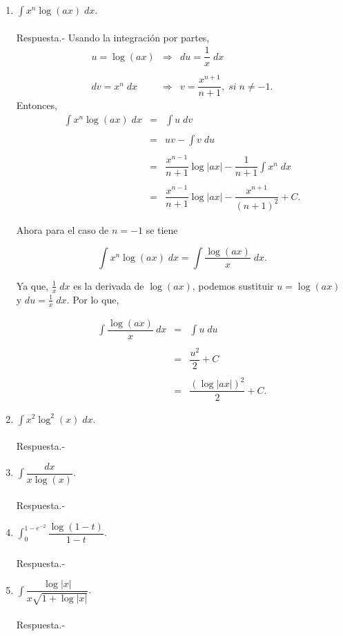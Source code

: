 \begin{enumerate}[\bfseries 1.]
    \item $\displaystyle\int x^n \log(ax)\; dx$.\\\\
	Respuesta.-\; Usando la integración por partes,
	$$
	\begin{array}{rcl}
	    u=\log(ax) &\Rightarrow& du=\dfrac{1}{x}\; dx\\\\
	    dv=x^n\; dx &\Rightarrow& v=\dfrac{x^{n+1}}{n+1}, \; si \; n\neq -1.
	\end{array}
	$$
	Entonces,
	$$
	\begin{array}{rcl}
	    \displaystyle\int x^n \log(ax)\; dx &=& \int u \; dv\\\\
						&=& uv-\displaystyle\int v\; du\\\\
						&=& \dfrac{x^{n-1}}{n+1}\log|ax| - \dfrac{1}{n+1}\displaystyle\int x^{n}\; dx\\\\
						&=& \dfrac{x^{n-1}}{n+1}\log|ax| - \dfrac{x^{n+1}}{(n+1)^2}+C.
	\end{array}
	$$

	Ahora para el caso de $n=-1$ se tiene

	$$\int x^n\log(ax)\; dx = \int \dfrac{\log(ax)}{x}\; dx.$$

	Ya que, $\frac{1}{x}\; dx$ es la derivada de $\log(ax)$, podemos sustituir $u=\log(ax)$ y $du=\frac{1}{x}\; dx$. Por lo que,

	$$
	\begin{array}{rcl}
	    \displaystyle\int \dfrac{\log(ax)}{x}\: dx &=& \displaystyle\int u\; du\\\\
						 &=& \dfrac{u^2}{2}+C\\\\
						 &=& \dfrac{(\log|ax|)^2}{2}+C.
	\end{array}
	$$
	\vspace{.5cm}


    \item $\displaystyle\int x^2\log^2(x)\; dx$.\\\\
	Respuesta.-\; 

    \item $\displaystyle\int \dfrac{dx}{x\log(x)}$.\\\\
	Respuesta.-\;

    \item $\displaystyle\int_0^{1-e^{-2}} \dfrac{\log(1-t)}{1-t}$.\\\\
	Respuesta.-\;

    \item $\displaystyle\int \dfrac{\log|x|}{x\sqrt{1+\log|x|}}$.\\\\
	Respuesta.-\;


\end{enumerate}

